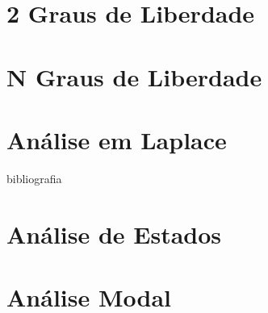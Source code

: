 \documentclass{article}
\begin{document}
\newpage\section{2 Graus de Liberdade}



\newpage\section{N Graus de Liberdade}

\newpage\section{Análise em Laplace}

bibliografia
\cite{620.3In6e}
\cite{629.8312}
\cite{620.3T387t}
\newpage\section{Análise de Estados}


\newpage\section{Análise Modal}

\newpage


\end{document}
